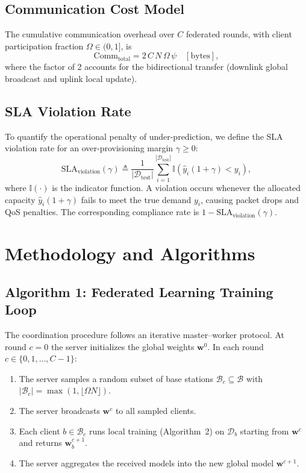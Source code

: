 \documentclass[11pt,a4paper]{article}
\begin{document}
\subsection{Communication Cost Model}
The cumulative communication overhead over $C$ federated rounds, with client participation fraction $\Omega \in (0, 1]$, is
\begin{equation}
    \text{Comm}_{\text{total}} = 2\, C\, N\, \Omega\, \psi \quad [\text{bytes}],
    \label{eq:comm_cost}
\end{equation}
where the factor of 2 accounts for the bidirectional transfer (downlink global broadcast and uplink local update).

\subsection{SLA Violation Rate}
To quantify the operational penalty of under-prediction, we define the SLA violation rate for an over-provisioning margin $\gamma \ge 0$:
\begin{equation}
    \text{SLA}_{\text{violation}}(\gamma) \triangleq \frac{1}{|\mathcal{D}_{\text{test}}|} \sum_{i=1}^{|\mathcal{D}_{\text{test}}|} \mathbb{I}\!\left( \hat{y}_i (1 + \gamma) < y_i \right),
    \label{eq:sla_violation}
\end{equation}
where $\mathbb{I}(\cdot)$ is the indicator function. A violation occurs whenever the allocated capacity $\hat{y}_i(1+\gamma)$ fails to meet the true demand $y_i$, causing packet drops and QoS penalties. The corresponding compliance rate is $1 - \text{SLA}_{\text{violation}}(\gamma)$.

\section{Methodology and Algorithms}

\subsection{Algorithm 1: Federated Learning Training Loop}
The coordination procedure follows an iterative master--worker protocol. At round $c=0$ the server initializes the global weights $\mathbf{w}^0$. In each round $c \in \{0, 1, \dots, C-1\}$:
\begin{enumerate}
    \item The server samples a random subset of base stations $\mathcal{B}_c \subseteq \mathcal{B}$ with $|\mathcal{B}_c| = \max(1, \lfloor \Omega N \rfloor)$.
    \item The server broadcasts $\mathbf{w}^c$ to all sampled clients.
    \item Each client $b \in \mathcal{B}_c$ runs local training (Algorithm~2) on $\mathcal{D}_b$ starting from $\mathbf{w}^c$ and returns $\mathbf{w}_b^{c+1}$.
    \item The server aggregates the received models into the new global model $\mathbf{w}^{c+1}$.
\end{enumerate}
\end{document}
